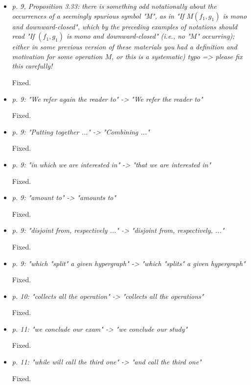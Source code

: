 \documentclass[english,11pt,a4paper]{article}
\begin{document}
\begin{itemize}
	We rewrote the definition.
	
	
	
	\item \emph{ p. 9, Proposition 3.33: there is something odd notationally about the occurrences of a seemingly spurious symbol "M", as in "If $M(f_1, g_1)$ is mono and downward-closed", which by the preceding examples of notations should read "If $(f_1, g_1)$ is mono and downward-closed" (i.e., no "$M$" occurring); either in some previous version of these materials you had a definition and motivation for some operation $M$, or this is a systematic) typo => please fix this carefully!}
	
	Fixed.
	
	\item \emph{ p. 9: "We refer again the reader to" -> "We refer the reader to"}
	
	Fixed.
	
	\item \emph{ p. 9: "Putting together ..." -> "Combining ..."}
	
	Fixed.
	
	\item \emph{ p. 9: "in which we are interested in" -> "that we are interested in"}
	
	Fixed.
	
	\item \emph{ p. 9: "amount to" -> "amounts to"}
	
	Fixed.
	
	\item \emph{ p. 9: "disjoint from, respectively ..." -> "disjoint from, respectively, ..."}
	
	Fixed.
	
	\item \emph{ p. 9: "which "split" a given hypergraph" -> "which "splits" a given hypergraph"}
	
	Fixed.
	
	\item \emph{ p. 10: "collects all the operation" -> "collects all the operations"}
	
	Fixed.
	
	\item \emph{ p. 11: "we conclude our exam" -> "we conclude our study"}
	
	Fixed.
	
	\item \emph{ p. 11: "while will call the third one" -> "and call the third one"}
	
	Fixed.
	

\end{itemize}
\end{document}
